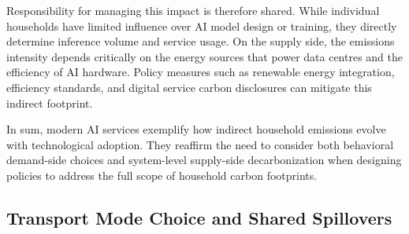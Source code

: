 \documentclass[12pt,a4paper]{article}%
\begin{document}
Responsibility for managing this impact is therefore shared. While individual households have limited influence over AI model design or training, they directly determine inference volume and service usage. On the supply side, the emissions intensity depends critically on the energy sources that power data centres and the efficiency of AI hardware. Policy measures such as renewable energy integration, efficiency standards, and digital service carbon disclosures can mitigate this indirect footprint.

In sum, modern AI services exemplify how indirect household emissions evolve with technological adoption. They reaffirm the need to consider both behavioral demand-side choices and system-level supply-side decarbonization when designing policies to address the full scope of household carbon footprints.

\subsection{Transport Mode Choice and Shared Spillovers}
\end{document}
